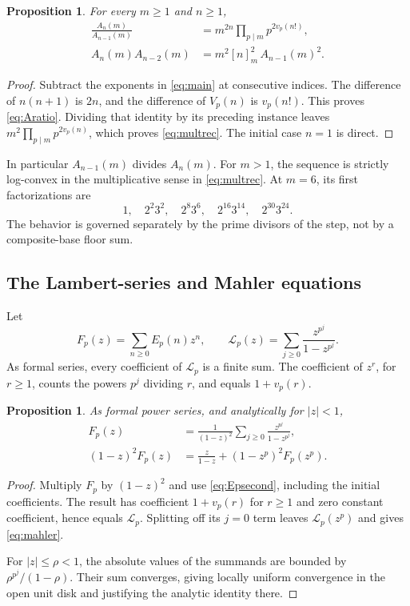 \documentclass[11pt,a4paper]{article}
\numberwithin{equation}{section}
\newtheorem{proposition}[theorem]{Proposition}
\theoremstyle{definition}
\theoremstyle{remark}
\begin{document}
\begin{proposition}\label{prop:multrec}
For every $m\geq1$ and $n\geq1$,
\begin{align}
 \frac{A_n(m)}{A_{n-1}(m)}
 &=m^{2n}\prod_{p\mid m}p^{2v_p(n!)},\label{eq:Aratio}\\
 A_n(m)A_{n-2}(m)
 &=m^2[n]_m^2\,A_{n-1}(m)^2.\label{eq:multrec}
\end{align}
\end{proposition}
\begin{proof}
Subtract the exponents in \eqref{eq:main} at consecutive indices. The difference of $n(n+1)$ is $2n$, and the difference of $V_p(n)$ is $v_p(n!)$. This proves \eqref{eq:Aratio}. Dividing that identity by its preceding instance leaves $m^2\prod_{p\mid m}p^{2v_p(n)}$, which proves \eqref{eq:multrec}. The initial case $n=1$ is direct.
\end{proof}

In particular $A_{n-1}(m)$ divides $A_n(m)$. For $m>1$, the sequence is strictly log-convex in the multiplicative sense in \eqref{eq:multrec}. At $m=6$, its first factorizations are
\[
 1,\quad 2^2 3^2,\quad 2^8 3^6,\quad 2^{16}3^{14},\quad 2^{30}3^{24}.
\]
The behavior is governed separately by the prime divisors of the step, not by a composite-base floor sum.

\subsection{The Lambert-series and Mahler equations}\label{sec:lambert}
Let
\[
 F_p(z)=\sum_{n\geq0}E_p(n)z^n,\qquad
 \mathcal L_p(z)=\sum_{j\geq0}\frac{z^{p^j}}{1-z^{p^j}}.
\]
As formal series, every coefficient of $\mathcal L_p$ is a finite sum. The coefficient of $z^r$, for $r\geq1$, counts the powers $p^j$ dividing $r$, and equals $1+v_p(r)$.

\begin{proposition}\label{prop:gf}
As formal power series, and analytically for $|z|<1$,
\begin{align}
 F_p(z)&=\frac1{(1-z)^2}\sum_{j\geq0}\frac{z^{p^j}}{1-z^{p^j}},\label{eq:gf}\\
 (1-z)^2F_p(z)&=\frac{z}{1-z}+(1-z^p)^2F_p(z^p).\label{eq:mahler}
\end{align}
\end{proposition}
\begin{proof}
Multiply $F_p$ by $(1-z)^2$ and use \eqref{eq:Epsecond}, including the initial coefficients. The result has coefficient $1+v_p(r)$ for $r\geq1$ and zero constant coefficient, hence equals $\mathcal L_p$. Splitting off its $j=0$ term leaves $\mathcal L_p(z^p)$ and gives \eqref{eq:mahler}.

For $|z|\leq\rho<1$, the absolute values of the summands are bounded by $\rho^{p^j}/(1-\rho)$. Their sum converges, giving locally uniform convergence in the open unit disk and justifying the analytic identity there.
\end{proof}
\end{document}
